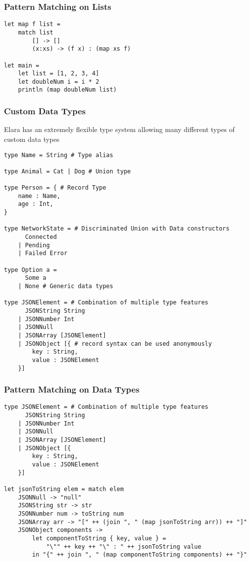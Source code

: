 \documentclass{article}
\begin{document}
\subsubsection{Pattern Matching on Lists}
\begin{verbatim}
let map f list =
    match list
        [] -> []
        (x:xs) -> (f x) : (map xs f)

let main = 
    let list = [1, 2, 3, 4]
    let doubleNum i = i * 2
    println (map doubleNum list)
\end{verbatim}

\subsubsection{Custom Data Types}
Elara has an extremely flexible type system allowing many different types of custom data types
\begin{verbatim}
type Name = String # Type alias

type Animal = Cat | Dog # Union type

type Person = { # Record Type
    name : Name,
    age : Int,
}

type NetworkState = # Discriminated Union with Data constructors
      Connected
    | Pending
    | Failed Error

type Option a = 
      Some a
    | None # Generic data types

type JSONElement = # Combination of multiple type features
      JSONString String
    | JSONNumber Int
    | JSONNull
    | JSONArray [JSONElement]
    | JSONObject [{ # record syntax can be used anonymously
        key : String,
        value : JSONElement
    }] 
\end{verbatim}

\subsubsection{Pattern Matching on Data Types}
\begin{verbatim}
type JSONElement = # Combination of multiple type features
      JSONString String
    | JSONNumber Int
    | JSONNull
    | JSONArray [JSONElement]
    | JSONObject [{
        key : String,
        value : JSONElement
    }]

let jsonToString elem = match elem
    JSONNull -> "null"
    JSONString str -> str
    JSONNumber num -> toString num
    JSONArray arr -> "[" ++ (join ", " (map jsonToString arr)) ++ "]"
    JSONObject components -> 
        let componentToString { key, value } = 
            "\"" ++ key ++ "\" : " ++ jsonToString value
        in "{" ++ join ", " (map componentToString components) ++ "}"

\end{verbatim}
\end{document}
